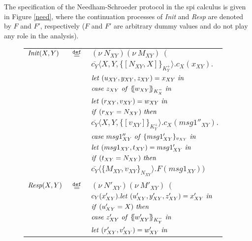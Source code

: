 \documentclass[10pt,a4paper,final,oneside,fleqn]{book}
\newcommand*{\eqdef}{\mathbin{\mathop{=}\limits^{\texttt{def}}}}
\begin{document}
The specification of the Needham-Schroeder protocol in the spi calculus is given in Figure \ref{need}, where the continuation processes of {\itshape Init\/} and {\itshape Resp\/} are denoted by $F$ and $F'$, respectively ($F$ and $F'$ are arbitrary dummy values and do not play any role in the analysis).
\begin{figure}[!tbp]
\begin{center}
\begin{tabular}{|lll|}
\hline
$\mbox{{\itshape Init\/}}(X,Y)$&$\eqdef$&$(\nu~\!N_{XY})(\nu~\!M_{XY})~~($\\
&&$\overline{c_{Y}}\langle X,Y,\{\![N_{XY},X]\!\}_{K^+_{Y}}\rangle.c_{X}(x_{XY}).$\\
&&$\mbox{{\itshape let\/} }(u_{XY},y_{XY},z_{XY})= x_{XY}\mbox{ {\itshape in\/}}$\\
&&$\mbox{{\itshape case\/} }z_{XY}\mbox{ {\itshape of\/} }\{\![w_{XY}]\!\}_{K^-_{X}}\mbox{ {\itshape in\/}}$\\
&&$\mbox{{\itshape let\/} }(r_{XY},v_{XY})=w_{XY}\mbox{ {\itshape in\/}}$\\
&&$\mbox{{\itshape if\/} }(r_{XY}=N_{XY})\mbox{ {\itshape then\/}}$\\
&&$\overline{c_{Y}}\langle X,Y,\{\![v_{XY}]\!\}_{K^+_{Y}}\rangle.c_{X}(msg1''_{XY}).$\\
&&$\mbox{{\itshape case\/} }msg1''_{XY}\mbox{ {\itshape of\/} }\{msg1'_{XY}\}_{v_{XY}}\mbox{ {\itshape in\/}}$\\
&&$\mbox{{\itshape let\/} }(msg1_{XY},t_{XY})=msg1'_{XY}\mbox{ {\itshape in\/}}$\\
&&$\mbox{{\itshape if\/} }(t_{XY}=N_{XY})\mbox{ {\itshape then\/}}$\\
&&$\overline{c_{Y}}\langle\{M_{XY},v_{XY}\}_{N_{XY}}\rangle.F(msg1_{XY}))$\\&&\\
$\mbox{{\itshape Resp\/}}(X,Y)$&$\eqdef$&$(\nu~\!N'_{XY})(\nu~\!M'_{XY})~~($\\
&&$c_{Y}(x'_{XY}).\mbox{{\itshape let\/} }(u'_{XY},y'_{XY},z'_{XY})=x'_{XY}\mbox{ {\itshape in\/}}$\\
&&$\mbox{{\itshape if\/} }(u'_{XY}=X)\mbox{ {\itshape then\/}}$\\
&&$\mbox{{\itshape case\/} }z'_{XY}\mbox{ {\itshape of\/} }\{\![w'_{XY}]\!\}_{K^-_{Y}}\mbox{ {\itshape in\/}}$\\
&&$\mbox{{\itshape let\/} }(r'_{XY},v'_{XY})=w'_{XY}\mbox{ {\itshape in\/}}$\\

\end{tabular}
\end{center}
\end{figure}
\end{document}
